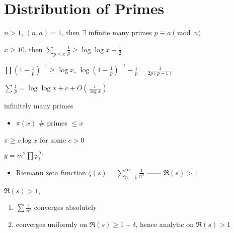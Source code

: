\section{Distribution of Primes}\label{sec:distribution-of-primes}

\begin{thm}
    $n > 1$, $(n, a) = 1$, then $\exists$ infinite many primes $p \equiv a \pmod{n}$
\end{thm}

\begin{prop}
    $x \geq 10$, then $\sum_{p \leq x} \frac{1}{p} \geq \log \log x - \frac{1}{2}$
\end{prop}
\begin{pf}
    $\prod (1 - \frac{1}{p})^{-1} \geq \log x$, $\log(1 - \frac{1}{p})^{-1} - \frac{1}{p} = \frac{1}{2p(p-1)}$
\end{pf}

\begin{fact}
    $\sum \frac{1}{p} = \log \log x + c + O(\frac{1}{\log x})$
\end{fact}

\begin{cor}
    infinitely many primes
\end{cor}

\begin{itemize}
    \item $\pi(x)$ \dash $\#$ primes $\leq x$
\end{itemize}

\begin{prop}
    $\pi \geq c \log x$ for some $c > 0$
\end{prop}
\begin{pf}
    $y = m^{2}\prod p_i^{\alpha_i}$
\end{pf}

\begin{itemize}
    \item Riemann zeta function $\zeta(s) = \sum_{n=1}^\infty \frac{1}{n^s}$ ------ $\Re(s) > 1$
\end{itemize}

\begin{lemma}
    $\Re(s) > 1$,
    \begin{enumerate}
        \item $\sum \frac{1}{n^s}$ converges absolutely
        \item converges uniformly on $\Re(s) \geq 1 + \delta$, hence analytic on $\Re(s) > 1$
    \end{enumerate}
\end{lemma}

